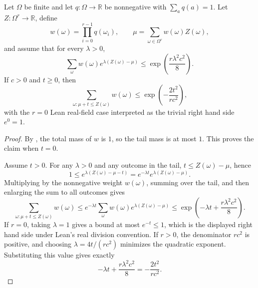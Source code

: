 \begin{helper}
Let \(\Omega\) be finite and let \(q:\Omega\to\mathbb R\) be nonnegative with
\(\sum_a q(a)=1\).  Let \(Z:\Omega^r\to\mathbb R\), define
\[
w(\omega)=\prod_{i=0}^{r-1}q(\omega_i),
\qquad
\mu=\sum_{\omega\in\Omega^r}w(\omega)Z(\omega),
\]
and assume that for every \(\lambda>0\),
\[
\sum_\omega w(\omega)e^{\lambda(Z(\omega)-\mu)}
\le
\exp\!\left(\frac{r\lambda^2c^2}{8}\right).
\]
If \(c>0\) and \(t\ge0\), then
\[
\sum_{\omega: \mu+t\le Z(\omega)}w(\omega)
\le
\exp\!\left(-\frac{2t^2}{r c^2}\right),
\]
with the \(r=0\) Lean real-field case interpreted as the trivial right hand
side \(e^0=1\).
\end{helper}
\begin{proof}
By , the total mass of \(w\) is \(1\), so the
tail mass is at most \(1\).  This proves the claim when \(t=0\).

Assume \(t>0\).  For any \(\lambda>0\) and any outcome in the tail,
\(t\le Z(\omega)-\mu\), hence
\[
1\le e^{\lambda(Z(\omega)-\mu-t)}
=e^{-\lambda t}e^{\lambda(Z(\omega)-\mu)}.
\]
Multiplying by the nonnegative weight \(w(\omega)\), summing over the tail,
and then enlarging the sum to all outcomes gives
\[
\sum_{\omega:\mu+t\le Z(\omega)}w(\omega)
\le
e^{-\lambda t}
\sum_\omega w(\omega)e^{\lambda(Z(\omega)-\mu)}
\le
\exp\!\left(-\lambda t+\frac{r\lambda^2c^2}{8}\right).
\]
If \(r=0\), taking \(\lambda=1\) gives a bound at most \(e^{-t}\le1\), which
is the displayed right hand side under Lean's real division convention.  If
\(r>0\), the denominator \(r c^2\) is positive, and choosing
\(\lambda=4t/(r c^2)\) minimizes the quadratic exponent.  Substituting this
value gives exactly
\[
-\lambda t+\frac{r\lambda^2c^2}{8}
=-\frac{2t^2}{r c^2}.
\]
\end{proof}
